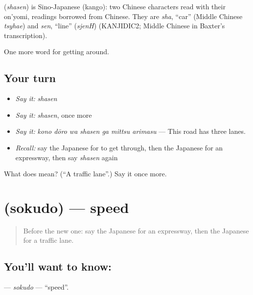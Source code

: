 \begin{cousinweb}
\textbf{} (\emph{shasen}) is Sino-Japanese (kango): two Chinese characters read with their on'yomi, readings borrowed from Chinese. They are \emph{sha}, \textquotedblleft{}car\textquotedblright{} (Middle Chinese \emph{tsyhae}) and \emph{sen}, \textquotedblleft{}line\textquotedblright{} (\emph{sjenH}) (KANJIDIC2; Middle Chinese in Baxter's transcription).
\end{cousinweb}

\begin{grammarlens}[title={What you've built}]
One more word for getting around.
\end{grammarlens}

\subsection*{Your turn}
\begin{itemize}
\raggedright
  \item \emph{Say it:} \emph{shasen}
  \item \emph{Say it:} \emph{shasen}, once more
  \item \emph{Say it:} \emph{kono dōro wa shasen ga mittsu arimasu} — This road has three lanes.
  \item \emph{Recall:} say the Japanese for to get through, then the Japanese for an expressway, then say \emph{shasen} again
\end{itemize}

\begin{tcolorbox}[breakable,colback=teal!4,colframe=teal!35!black,title={Before you move on}]
What does  mean? (\textquotedblleft{}A traffic lane\textquotedblright{}.) Say it once more.
\end{tcolorbox}
\section[\texorpdfstring{\ja{そくど} (sokudo)}{そくど (sokudo)}]{ (sokudo) — speed}

\label{lesson:JA-C390-sokudo}



\begin{quote}
Before the new one: say the Japanese for an expressway, then the Japanese for a traffic lane.
\end{quote}

\subsection*{You'll want to know: }
\textbf{} — \emph{sokudo} — \textquotedblleft{}speed\textquotedblright{}.

